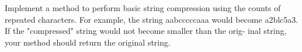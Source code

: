  \label{sssec:ex1_05}

Implement a method to perform basic string compression using the counts
of repeated characters. For example, the string aabcccccaaa would become
a2blc5a3. If the "compressed" string would not become smaller than the orig-
inal string, your method should return the original string.



